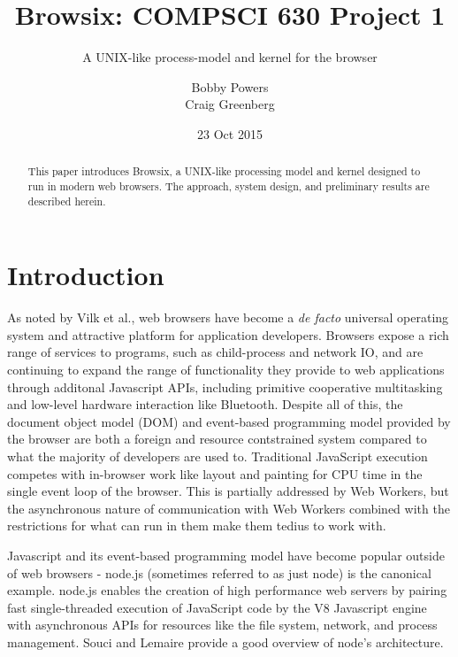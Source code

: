 \documentclass{acm_proc_article-sp}
\begin{document}
\title{Browsix: COMPSCI 630 Project 1}
\subtitle{A UNIX-like process-model and kernel for the browser}

\author{
\alignauthor Bobby Powers\\
\alignauthor Craig Greenberg\\
}
\date{23 Oct 2015}

\maketitle
\begin{abstract}
  This paper introduces Browsix, a UNIX-like processing model and
  kernel designed to run in modern web browsers.  The approach, system
  design, and preliminary results are described herein.
\end{abstract}

\section{Introduction}

As noted by Vilk et al., web browsers have become a \emph{de facto}
universal operating system and attractive platform for application
developers\cite{vilk:2014doppio}.  Browsers expose a rich range of
services to programs, such as child-process and network IO, and are
continuing to expand the range of functionality they provide to web
applications through additonal Javascript APIs, including primitive
cooperative multitasking\cite{mcilroy:2015chrome47} and low-level
hardware interaction like Bluetooth\cite{yasskin:2015webbluetooth}.
Despite all of this, the document object model (DOM) and event-based
programming model provided by the browser are both a foreign and
resource contstrained system compared to what the majority of
developers are used to.  Traditional JavaScript execution competes
with in-browser work like layout and painting for CPU time in the
single event loop of the browser.  This is partially addressed by Web
Workers, but the asynchronous nature of communication with Web Workers
combined with the restrictions for what can run in them make them
tedius to work with.

Javascript and its event-based programming model have become popular
outside of web browsers - node.js (sometimes referred to as just node)
is the canonical example.  node.js enables the creation of high
performance web servers by pairing fast single-threaded execution of
JavaScript code by the V8 Javascript engine with asynchronous APIs for
resources like the file system, network, and process management.
Souci and Lemaire\cite{souci:2014} provide a good overview of node's
architecture.
\end{document}
